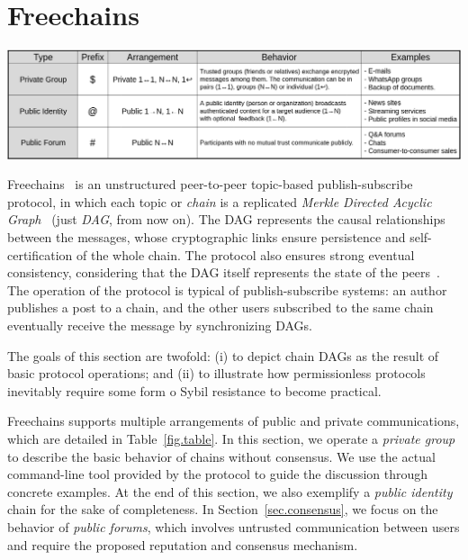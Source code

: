 \documentclass[10pt,journal,compsoc]{IEEEtran}
\newcommand{\FC}       {Freechains\xspace}
\begin{document}

\section{\FC}
\label{sec.freechains}

\begin{table}
\centering
\includegraphics[width=\textwidth]{arrangements.png}
\caption{The three types of chains and arrangements in \FC.}
\label{fig.table}
\end{table}

\FC~\cite{fcs.sbseg20} is an unstructured peer-to-peer topic-based
publish-subscribe protocol, in which each topic or \emph{chain} is a replicated
\emph{Merkle Directed Acyclic Graph}~\cite{p2p.ipfs} (just \emph{DAG}, from now
on).
The DAG represents the causal relationships between the messages, whose
cryptographic links ensure persistence and self-certification of the whole
chain.
The protocol also ensures strong eventual consistency, considering that the DAG
itself represents the state of the peers~\cite{fed.matrix,p2p.byz}.
%
The operation of the protocol is typical of publish-subscribe systems: an
author publishes a post to a chain, and the other users subscribed to the same
chain eventually receive the message by synchronizing DAGs.

The goals of this section are twofold:
    (i)  to depict chain DAGs as the result of basic protocol operations; and
    (ii) to illustrate how permissionless protocols inevitably require some
         form o Sybil resistance to become practical.

\FC supports multiple arrangements of public and private communications, which
are detailed in Table~\ref{fig.table}.
In this section, we operate a \emph{private group} to describe the basic
behavior of chains without consensus.
We use the actual command-line tool provided by the protocol to guide the
discussion through concrete examples.
At the end of this section, we also exemplify a \emph{public identity} chain
for the sake of completeness.
In Section~\ref{sec.consensus}, we focus on the behavior of \emph{public
forums}, which involves untrusted communication between users and require the
proposed reputation and consensus mechanism.
\end{document}
